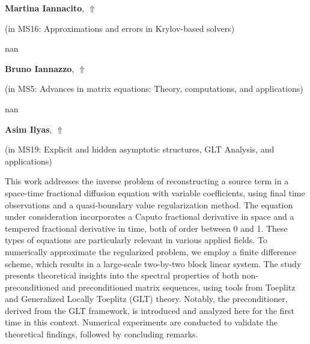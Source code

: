 \documentclass[ILAS2025-program.tex]{subfiles}
\begin{document}
     \hypertarget{down0345}{}\begin{ilasabstract}
    
    \textbf{Martina Iannacito},  \hfill \hyperlink{up0345}{$\Uparrow$}
    
    (in {\color{mstitle}MS16: Approximations and errors in Krylov-based solvers})
        
        \mtskip
    nan\end{ilasabstract}
     \hypertarget{down0065}{}\begin{ilasabstract}
    
    \textbf{Bruno Iannazzo},  \hfill \hyperlink{up0065}{$\Uparrow$}
    
    (in {\color{mstitle}MS5: Advances in matrix equations: Theory, computations, and applications})
        
        \mtskip
    nan\end{ilasabstract}
     \hypertarget{down0176}{}\begin{ilasabstract}
    
    \textbf{Asim Ilyas},  \hfill \hyperlink{up0176}{$\Uparrow$}
    
    (in {\color{mstitle}MS19: Explicit and hidden asymptotic structures, GLT Analysis, and applications})
        
        \mtskip
    This work addresses the inverse problem of reconstructing a source term in a space-time fractional diffusion equation with variable coefficients, using final time observations and a quasi-boundary value regularization method. The equation under consideration incorporates a Caputo fractional derivative in space and a tempered fractional derivative in time, both of order between 0 and 1. These types of equations are particularly relevant in various applied fields. To numerically approximate the regularized problem, we employ a finite difference scheme, which results in a large-scale two-by-two block linear system. The study presents theoretical insights into the spectral properties of both non-preconditioned and preconditioned matrix sequences, using tools from Toeplitz and Generalized Locally Toeplitz (GLT) theory. Notably, the preconditioner, derived from the GLT framework, is introduced and analyzed here for the first time in this context. Numerical experiments are conducted to validate the theoretical findings, followed by concluding remarks.
\end{ilasabstract}
\end{document}
